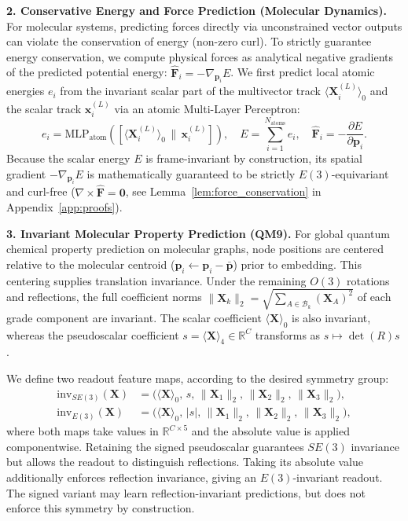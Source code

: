\documentclass[10pt]{article}
\begin{document}
\noindent\textbf{2. Conservative Energy and Force Prediction (Molecular Dynamics).}
For molecular systems, predicting forces directly via unconstrained vector outputs can violate the conservation of energy (non-zero curl). To strictly guarantee energy conservation, we compute physical forces as analytical negative gradients of the predicted potential energy: $\hat{\mathbf{F}}_i = -\nabla_{\mathbf{p}_i} E$.
We first predict local atomic energies $e_i$ from the invariant scalar part of the multivector track $\langle \mathbf{X}_i^{(L)} \rangle_0$ and the scalar track $\mathbf{x}_i^{(L)}$ via an atomic Multi-Layer Perceptron:
\begin{equation}
    e_i = \mathrm{MLP}_{\text{atom}}\left( [\langle \mathbf{X}_i^{(L)} \rangle_0 \,\|\, \mathbf{x}_i^{(L)}] \right), \quad E = \sum_{i=1}^{N_{\text{atoms}}} e_i, \quad \hat{\mathbf{F}}_i = -\frac{\partial E}{\partial \mathbf{p}_i}.
    \label{eq:energy_force_readout}
\end{equation}
Because the scalar energy $E$ is frame-invariant by construction, its spatial gradient $-\nabla_{\mathbf{p}_i} E$ is mathematically guaranteed to be strictly $E(3)$-equivariant and curl-free ($\nabla \times \hat{\mathbf{F}} = \mathbf{0}$, see Lemma~\ref{lem:force_conservation} in Appendix~\ref{app:proofs}).

\noindent\textbf{3. Invariant Molecular Property Prediction (QM9).}
For global quantum chemical property prediction on molecular graphs, node positions are centered relative to the molecular centroid ($\mathbf{p}_i \leftarrow \mathbf{p}_i - \bar{\mathbf{p}}$) prior to embedding. This centering supplies translation invariance. Under the remaining $O(3)$ rotations and reflections, the full coefficient norms $\|\mathbf{X}_k\|_2 = \sqrt{\sum_{A \in \mathcal{B}_k} (\mathbf{X}_A)^2}$ of each grade component are invariant. The scalar coefficient $\langle\mathbf{X}\rangle_0$ is also invariant, whereas the pseudoscalar coefficient $s=\langle\mathbf{X}\rangle_4\in\mathbb{R}^{C}$ transforms as $s\mapsto\det(R)s$.

We define two readout feature maps, according to the desired symmetry group:
\begin{equation}
    \begin{aligned}
    \mathrm{inv}_{SE(3)}(\mathbf{X})
      &= \Big(\langle\mathbf{X}\rangle_0,\,s,\,\|\mathbf{X}_1\|_2,\,\|\mathbf{X}_2\|_2,\,\|\mathbf{X}_3\|_2\Big),\\
    \mathrm{inv}_{E(3)}(\mathbf{X})
      &= \Big(\langle\mathbf{X}\rangle_0,\,|s|,\,\|\mathbf{X}_1\|_2,\,\|\mathbf{X}_2\|_2,\,\|\mathbf{X}_3\|_2\Big),
    \end{aligned}
    \label{eq:pin_invariants}
\end{equation}
where both maps take values in $\mathbb{R}^{C\times5}$ and the absolute value is applied componentwise. Retaining the signed pseudoscalar guarantees $SE(3)$ invariance but allows the readout to distinguish reflections. Taking its absolute value additionally enforces reflection invariance, giving an $E(3)$-invariant readout. The signed variant may learn reflection-invariant predictions, but does not enforce this symmetry by construction.
\end{document}
